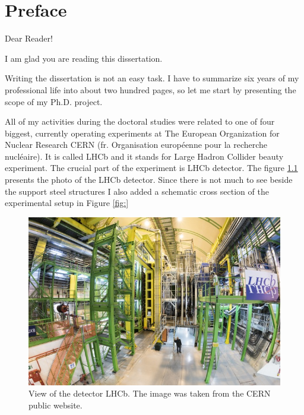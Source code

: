 \chapter{Preface}
\label{introduction}

Dear Reader! 

I am glad you are reading this dissertation.  

Writing the dissertation is not an easy task. I have to summarize six years of my professional life into about two hundred pages, so let me start by presenting the scope of my Ph.D. project. 

All of my activities during the doctoral studies were related to one of four biggest, currently operating experiments at  The European Organization for Nuclear Research CERN (fr.  Organisation européenne pour la recherche nucléaire).  It is called LHCb and it stands for Large Hadron Collider beauty experiment. The crucial part of the experiment is LHCb detector. The figure \ref{fig:LHCBphoto} presents the photo of the LHCb detector. Since there is not much to see beside the support steel structures I also added a schematic cross section of the experimental setup in Figure \ref{fig:}


\begin{figure}
\includegraphics[width=\textwidth]{figures/LHCB_photo}
\caption{View of the detector LHCb. The image was taken from the CERN public website. 
\label{fig:LHCBphoto}}
\end{figure}

